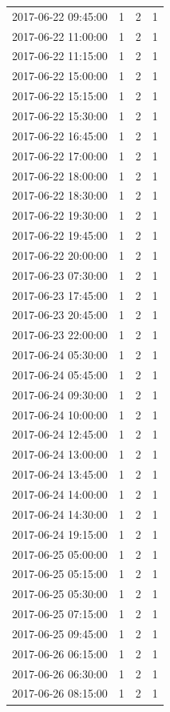 \begin{tabular}{lrrr}
2017-06-22 09:45:00 & 1 & 2 & 1 \\
2017-06-22 11:00:00 & 1 & 2 & 1 \\
2017-06-22 11:15:00 & 1 & 2 & 1 \\
2017-06-22 15:00:00 & 1 & 2 & 1 \\
2017-06-22 15:15:00 & 1 & 2 & 1 \\
2017-06-22 15:30:00 & 1 & 2 & 1 \\
2017-06-22 16:45:00 & 1 & 2 & 1 \\
2017-06-22 17:00:00 & 1 & 2 & 1 \\
2017-06-22 18:00:00 & 1 & 2 & 1 \\
2017-06-22 18:30:00 & 1 & 2 & 1 \\
2017-06-22 19:30:00 & 1 & 2 & 1 \\
2017-06-22 19:45:00 & 1 & 2 & 1 \\
2017-06-22 20:00:00 & 1 & 2 & 1 \\
2017-06-23 07:30:00 & 1 & 2 & 1 \\
2017-06-23 17:45:00 & 1 & 2 & 1 \\
2017-06-23 20:45:00 & 1 & 2 & 1 \\
2017-06-23 22:00:00 & 1 & 2 & 1 \\
2017-06-24 05:30:00 & 1 & 2 & 1 \\
2017-06-24 05:45:00 & 1 & 2 & 1 \\
2017-06-24 09:30:00 & 1 & 2 & 1 \\
2017-06-24 10:00:00 & 1 & 2 & 1 \\
2017-06-24 12:45:00 & 1 & 2 & 1 \\
2017-06-24 13:00:00 & 1 & 2 & 1 \\
2017-06-24 13:45:00 & 1 & 2 & 1 \\
2017-06-24 14:00:00 & 1 & 2 & 1 \\
2017-06-24 14:30:00 & 1 & 2 & 1 \\
2017-06-24 19:15:00 & 1 & 2 & 1 \\
2017-06-25 05:00:00 & 1 & 2 & 1 \\
2017-06-25 05:15:00 & 1 & 2 & 1 \\
2017-06-25 05:30:00 & 1 & 2 & 1 \\
2017-06-25 07:15:00 & 1 & 2 & 1 \\
2017-06-25 09:45:00 & 1 & 2 & 1 \\
2017-06-26 06:15:00 & 1 & 2 & 1 \\
2017-06-26 06:30:00 & 1 & 2 & 1 \\
2017-06-26 08:15:00 & 1 & 2 & 1 \\

\end{tabular}
